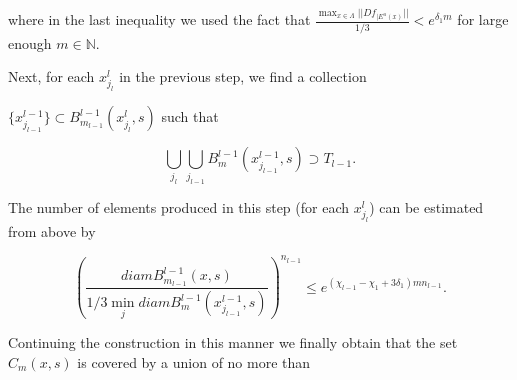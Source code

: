 \documentclass{amsart}
\theoremstyle{plain}
\theoremstyle{definition}
\theoremstyle{remark}
\numberwithin{equation}{section}
\begin{document}
where in the last inequality we used the fact that $\frac{\max_{x\in\Lambda}||Df_{|E^u(x)}||}{1/3 } < e^{\delta_1 m}$ for large enough $m\in\mathbb{N}$.


Next, for each $x^l_{j_l}$ in the previous step, we find a collection

 $\{   x^{l-1}_{j_{l-1}}   \} \subset     B^{l-1}_{m_{l-1}}(x^l_{j_l},s)      $ such that


$$  \bigcup_{j_l}     \bigcup_{j_{l-1}}   B^{l-1}_m(x^{l-1}_{j_{l-1}},s)     \supset  T_{l-1}.  $$

The number of elements produced in this step (for each  $x^l_{j_l}$) can be estimated from above by


$$  \left( \frac{diam B^{l-1}_{m_{l-1}}(x,s)}{1/3 \min_j diam    B^{l-1}_{m}(x^{l-1}_{j_{l-1}},s) }  \right)^{n_{l-1}}    \leq   e^{(\chi_{l-1} - \chi_1 + 3\delta_1)m n_{l-1}}.$$











Continuing the construction in this manner we finally obtain that the set $ C_m(x,s)$ is covered by a union of no more than 
\end{document}
